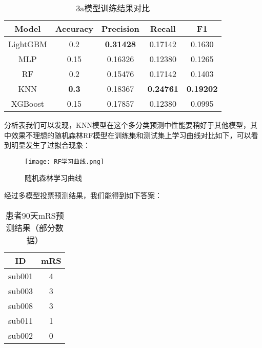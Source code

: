 \documentclass[bwprint]{gmcmthesis}
\begin{document}
				\begin{table}[H]
					\centering
					\caption{3a模型训练结果对比}
					\label{tab:13}
					\setlength{\tabcolsep}{7mm}
					\begin{tabular}{|c|c|c|c|c|}
						\hline
						\rowcolor{green!30} Model & Accuracy & Precision &Recall & F1 \\ \hline
						\rowcolor{green!5}LightGBM & 0.2  & \textbf{0.31428} & 0.17142& 0.1630\\ \hline
						\rowcolor{white!5}MLP & 0.15  & 0.16326
						& 0.12380 & 0.1265\\ \hline
						\rowcolor{green!5}RF & 0.2  & 0.15476
						& 0.17142 & 0.1403\\ \hline
						\rowcolor{white!5}KNN & \textbf{0.3}  & 0.18367
						& \textbf{0.24761} & \textbf{0.19202}\\ \hline
						\rowcolor{green!5}XGBoost& 0.15 & 0.17857  & 0.12380 & 0.0995 \\ \hline
					\end{tabular}
				\end{table}
				
				分析表我们可以发现，KNN模型在这个多分类预测中性能要稍好于其他模型，其中效果不理想的随机森林RF模型在训练集和测试集上学习曲线对比如下，可以看到明显发生了过拟合现象：
				
			
				\begin{figure}[H]
				\centering
				\caption{随机森林学习曲线}
				\texttt{[image: RF学习曲线.png]}
				\label{fig:15}
				\end{figure}
				
				经过多模型投票预测结果，我们能得到如下答案：
				
				\begin{table}[H]
					\centering
					\label{tab:14}
					\caption{患者90天mRS预测结果（部分数据）}
					\setlength{\tabcolsep}{17mm}
					\begin{tabular}{|c|c|}
						\hline
						\rowcolor{blue!25} ID & mRS \\ \hline
						\rowcolor{blue!5}sub001 & 4 \\ \hline
						\rowcolor{white!5}sub003 & 3\\ \hline
						\rowcolor{blue!5}sub008 & 3 \\ \hline
						\rowcolor{white!5}sub011 & 1  \\ \hline
						\rowcolor{blue!5}sub002 & 0  \\ \hline
					\end{tabular}
				\end{table}
				
\end{document}
